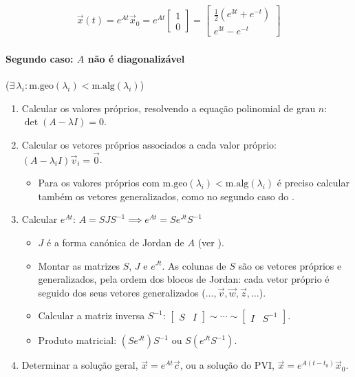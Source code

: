 \documentclass{article}
\begin{document}
\begin{gather*}
\boxed{\vec{x}(t) = e^{At}\vec{x}_0 = e^{At}
\begin{bmatrix}
1 \\
0
\end{bmatrix}
=
\begin{bmatrix}
\frac{1}{2}\left( e^{3t} + e^{-t} \right) \\
e^{3t} - e^{-t}
\end{bmatrix}}
\end{gather*}

\paragraph{Segundo caso: $A$ não é diagonalizável}
($\exists \, \lambda_i : \text{m.geo}(\lambda_i) < \text{m.alg}(\lambda_i)$)

\begin{enumerate}
    \item Calcular os valores próprios, resolvendo a equação polinomial de grau $n$: $\det(A - \lambda I) = 0$.
    \item Calcular os vetores próprios associados a cada valor próprio: $(A - \lambda_i I)\vec{v}_i = \vec{0}$.
    \begin{itemize}
        \item Para os valores próprios com $\text{m.geo}(\lambda_i) < \text{m.alg}(\lambda_i)$
        é preciso calcular também os vetores generalizados, como no segundo caso do
        .
    \end{itemize}
    \item Calcular $e^{At}$:
    $\boxed{A = S J S^{-1} \implies e^{At} = S e^{J t} S^{-1}}$
    \begin{itemize}
        \item $J$ é a forma canónica de Jordan de $A$ (ver ).
        \item Montar as matrizes $S$, $J$ e $e^{J t}$. As colunas de $S$ são os vetores próprios e
        generalizados, pela ordem dos blocos de Jordan: cada vetor próprio é seguido dos seus vetores
        generalizados ($\ldots, \vec{v}, \vec{w}, \vec{z}, \ldots$).
        \item Calcular a matriz inversa $S^{-1}$:
        $\left[ \begin{array}{c|c} S & I \end{array} \right] \sim \cdots \sim
        \left[ \begin{array}{c|c} I & S^{-1} \end{array} \right]$.
        \item Produto matricial: $(S e^{J t})S^{-1}$ ou $S (e^{J t} S^{-1})$.
    \end{itemize}
    \item Determinar a solução geral, $\vec{x} = e^{At}\vec{c}$, ou a solução do PVI,
    $\vec{x} = e^{A(t - t_0)}\vec{x}_0$.
\end{enumerate}
\end{document}
